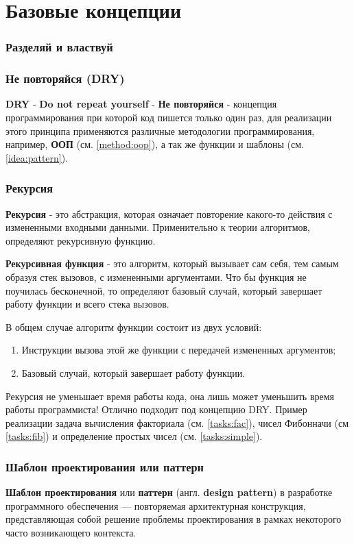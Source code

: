 \part{Базовые концепции}

\section{Разделяй и властвуй \label{idea:diff}}

\section{Не повторяйся (DRY) \label{idea:dry}}

\textbf{DRY} - \textbf{Do not repeat yourself} - \textbf{Не повторяйся} - концепция программирования при которой код пишется только один раз, для реализации этого принципа применяются различные методологии программирования, например, \textbf{ООП} (см. \ref{method:oop}), а так же функции и шаблоны (см. \ref{idea:pattern}).

\section{Рекурсия \label{idea:recur}}

\textbf{Рекурсия} - это абстракция, которая означает повторение какого-то действия с измененными входными данными. Применительно к теории алгоритмов, определяют рекурсивную функцию. 

\textbf{Рекурсивная функция} - это алгоритм, который вызывает сам себя, тем самым образуя стек вызовов, с измененными аргументами. Что бы функция не поучилась бесконечной, то определяют базовый случай, который завершает работу функции и всего стека вызовов.

В общем случае алгоритм функции состоит из двух условий:
\begin{enumerate}
\item Инструкции вызова этой же функции с передачей измененных аргументов;
\item Базовый случай, который завершает работу функции.
\end{enumerate}

Рекурсия не уменьшает время работы кода, она лишь может уменьшить время работы программиста! Отлично подходит под концепцию DRY. Пример реализации задача вычисления факториала (см. \ref{tasks:fac}), чисел Фибонначи (см \ref{tasks:fib}) и определение простых чисел (см. \ref{tasks:simple}). 

\section{Шаблон проектирования или паттерн \label{idea:pattern}}

\textbf{Шаблон проектирования} или \textbf{паттерн} (англ. \textbf{design pattern}) в разработке программного обеспечения — повторяемая архитектурная конструкция, представляющая собой решение проблемы проектирования в рамках некоторого часто возникающего контекста.
